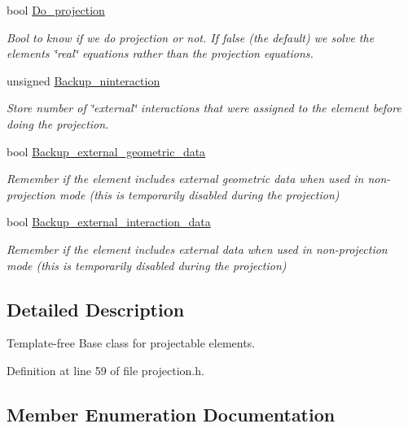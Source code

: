 \begin{DoxyCompactItemize}
bool \hyperlink{classoomph_1_1ProjectableElementBase_a8e6db97455edb38611347e258593f592}{Do\+\_\+projection}
\begin{DoxyCompactList}\small\item\em Bool to know if we do projection or not. If false (the default) we solve the element\textquotesingle{}s \char`\"{}real\char`\"{} equations rather than the projection equations. \end{DoxyCompactList}\item 
unsigned \hyperlink{classoomph_1_1ProjectableElementBase_a638bf48f5b8dd513c18413cd3878c0d1}{Backup\+\_\+ninteraction}
\begin{DoxyCompactList}\small\item\em Store number of \char`\"{}external\char`\"{} interactions that were assigned to the element before doing the projection. \end{DoxyCompactList}\item 
bool \hyperlink{classoomph_1_1ProjectableElementBase_a907f0491ccf46f64e97365afc2fcb773}{Backup\+\_\+external\+\_\+geometric\+\_\+data}
\begin{DoxyCompactList}\small\item\em Remember if the element includes external geometric data when used in non-\/projection mode (this is temporarily disabled during the projection) \end{DoxyCompactList}\item 
bool \hyperlink{classoomph_1_1ProjectableElementBase_a0f9195c254f229b178a8844f2572c7d4}{Backup\+\_\+external\+\_\+interaction\+\_\+data}
\begin{DoxyCompactList}\small\item\em Remember if the element includes external data when used in non-\/projection mode (this is temporarily disabled during the projection) \end{DoxyCompactList}\end{DoxyCompactItemize}


\subsection{Detailed Description}
Template-\/free Base class for projectable elements. 

Definition at line 59 of file projection.\+h.



\subsection{Member Enumeration Documentation}
\mbox{\label{classoomph_1_1ProjectableElementBase_aa6b28955725b5626cc4cbf0465f12a9e}} 
